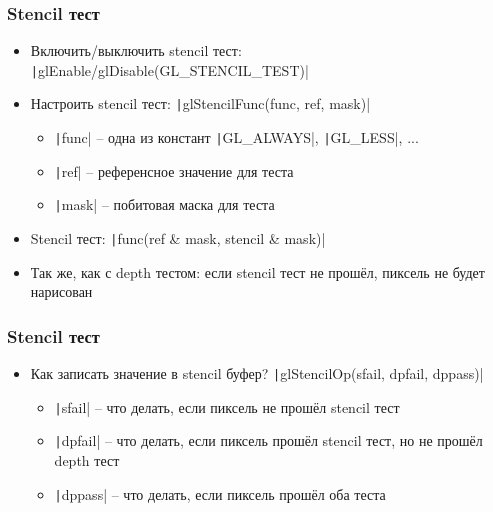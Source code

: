 \documentclass[10pt]{beamer}
\begin{document}
\begin{frame}[fragile]
\frametitle{Stencil тест}
\begin{itemize}
\item Включить/выключить stencil тест: \texttt|glEnable/glDisable(GL_STENCIL_TEST)|
\pause
\item Настроить stencil тест: \texttt|glStencilFunc(func, ref, mask)|
\begin{itemize}
\item \texttt|func| -- одна из констант \texttt|GL_ALWAYS|, \texttt|GL_LESS|, ...
\item \texttt|ref| -- референсное значение для теста
\item \texttt|mask| -- побитовая маска для теста
\end{itemize}
\item Stencil тест: \texttt|func(ref & mask, stencil & mask)|
\pause
\item Так же, как с depth тестом: если stencil тест не прошёл, пиксель не будет нарисован
\end{itemize}
\end{frame}

\begin{frame}[fragile]
\frametitle{Stencil тест}
\begin{itemize}
\item Как записать значение в stencil буфер? \pause \texttt|glStencilOp(sfail, dpfail, dppass)|
\pause
\begin{itemize}
\item \texttt|sfail| -- что делать, если пиксель не прошёл stencil тест
\item \texttt|dpfail| -- что делать, если пиксель прошёл stencil тест, но не прошёл depth тест
\item \texttt|dppass| -- что делать, если пиксель прошёл оба теста
\end{itemize}
\end{itemize}
\end{frame}
\end{document}
